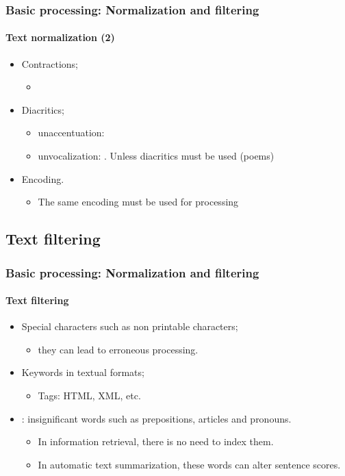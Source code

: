 \documentclass[xcolor=table]{beamer}
\begin{document}
\begin{frame}
\frametitle{Basic processing: Normalization and filtering}
\framesubtitle{Text normalization (2)}


\begin{itemize}
	
	\item Contractions;
	\begin{itemize}
		\item {}
	\end{itemize}
	
	\item Diacritics;
	\begin{itemize}
		\item unaccentuation:  
		\item unvocalization:  . Unless diacritics must be used (poems)
	\end{itemize}

	\item Encoding.
	\begin{itemize}
		\item The same encoding must be used for processing
	\end{itemize}

\end{itemize}

\end{frame}

\subsection{Text filtering}

\begin{frame}
\frametitle{Basic processing: Normalization and filtering}
\framesubtitle{Text filtering}

\begin{itemize}
	\item Special characters such as non printable characters;
	\begin{itemize}
		\item they can lead to erroneous processing. 
	\end{itemize}
	\item Keywords in textual formats;
	\begin{itemize}
		\item Tags: HTML, XML, etc. 
	\end{itemize}
	\item {}: insignificant words such as prepositions, articles and pronouns.
	\begin{itemize}
		\item In information retrieval, there is no need to index them.
		\item In automatic text summarization, these words can alter sentence scores.
	\end{itemize}
\end{itemize}

\end{frame}
\end{document}

